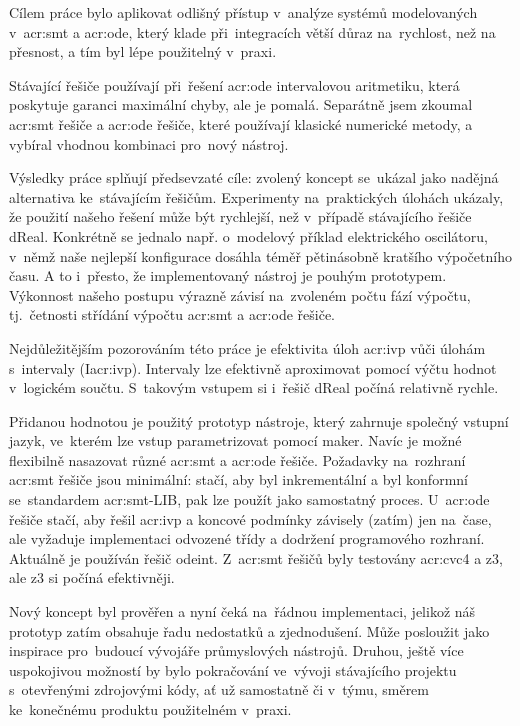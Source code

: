\documentclass[thesis=M,czech]{FITthesis}[2012/06/26]
\newcommand{\acrlabel}[1]{acr:#1}
\newcommand{\acr}[1]{\acrshort{\acrlabel{#1}}}
\begin{document}

\begin{conclusion}\label{ch:outro}
Cílem práce bylo aplikovat odlišný přístup
v~analýze systémů modelovaných
v~\acr{smt} a \acr{ode},
který klade při~integracích větší
důraz na~rychlost, než na přesnost,
a tím byl lépe použitelný v~praxi.

Stávající řešiče používají při~řešení \acr{ode}
intervalovou aritmetiku, která poskytuje
garanci maximální chyby,
ale je pomalá.
Separátně jsem zkoumal \acr{smt} řešiče
a \acr{ode} řešiče, které používají
klasické numerické metody,
a vybíral vhodnou kombinaci
pro~nový nástroj.

Výsledky práce splňují předsevzaté cíle:
zvolený koncept se~ukázal jako nadějná
alternativa ke~stávajícím řešičům.
Experimenty na~praktických úlohách ukázaly,
že použití našeho řešení
může být rychlejší,
než v~případě stávajícího řešiče dReal.
Konkrétně se jednalo např. o~modelový příklad
elektrického oscilátoru,
v~němž naše nejlepší konfigurace dosáhla
téměř pětinásobně kratšího výpočetního času.
A to i~přesto, že implementovaný nástroj
je pouhým prototypem.
Výkonnost našeho postupu výrazně závisí
na~zvoleném počtu fází výpočtu,
tj.~četnosti střídání výpočtu \acr{smt} a \acr{ode} řešiče.

Nejdůležitějším pozorováním této práce
je efektivita úloh \acr{ivp}
vůči úlohám s~intervaly (I\acr{ivp}).
Intervaly lze efektivně aproximovat
pomocí výčtu hodnot v~logickém součtu.
S~takovým vstupem si i~řešič dReal
počíná relativně rychle.

Přidanou hodnotou je použitý prototyp nástroje,
který zahrnuje společný vstupní jazyk,
ve~kterém lze vstup parametrizovat pomocí maker.
Navíc je možné flexibilně
nasazovat různé \acr{smt} a \acr{ode} řešiče.
Požadavky na~rozhraní \acr{smt} řešiče
jsou minimální: stačí, aby byl inkrementální
a byl konformní se~standardem \acr{smt}-LIB,
pak lze použít jako samostatný proces.
U~\acr{ode} řešiče stačí, aby řešil \acr{ivp}
a koncové podmínky závisely (zatím) jen na~čase,
ale vyžaduje implementaci
odvozené třídy a dodržení programového rozhraní.
Aktuálně je používán řešič odeint.
Z~\acr{smt} řešičů byly testovány
\acr{cvc}4 a z3,
ale z3 si počíná efektivněji.

Nový koncept byl prověřen a nyní čeká
na~řádnou implementaci,
jelikož náš prototyp zatím obsahuje řadu nedostatků a zjednodušení.
Může posloužit jako inspirace pro~budoucí vývojáře
průmyslových nástrojů.
Druhou, ještě více uspokojivou možností
by bylo pokračování ve~vývoji stávajícího projektu
s~otevřenými zdrojovými kódy,
ať už samostatně či v~týmu,
směrem ke~konečnému produktu použitelném v~praxi.
\end{conclusion}
\end{document}
